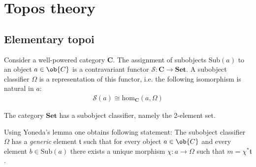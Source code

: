 \chapter{Topos theory}

\section{Elementary topoi}

	\begin{adefinition}
		Consider a well-powered category \textbf{C}. The assignment of subobjects Sub$(a)$ to an object $a\in\ob{C}$ is a contravariant functor $\mathcal{S}:\mathbf{C}\rightarrow\mathbf{Set}$. A subobject classifier $\Omega$ is a representation of this functor, i.e. the following isomorphism is natural in $a$:
		\begin{gather}
			\mathcal{S}(a)\cong\text{hom}_{\mathbf{C}}(a, \Omega)
		\end{gather}
	\end{adefinition}
	
	\begin{example}
		The category $\mathbf{Set}$ has a subobject classifier, namely the 2-element set.
	\end{example}
	
	\begin{property}
		Using Yoneda's lemma one obtains following statement: The subobject classifier $\Omega$ has a \textit{generic} element $\mathfrak{t}$ such that for every object $a\in\ob{C}$ and every element $b\in\text{Sub}(a)$ there exists a unique morphism $\chi:a\rightarrow\Omega$ such that $m = \chi^*\mathfrak{t}$.
	\end{property}

